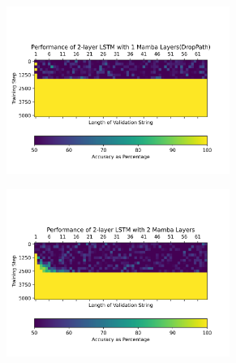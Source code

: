 \begin{figure}
\begin{subfigure}{0.5\textwidth}
\begin{center}
        \end{center}
    \end{subfigure}\begin{subfigure}{0.5\textwidth}
        \begin{center}
        \includegraphics[width=0.8\textwidth]{figures/parity_lstm_True_3_2.png.png}
        \end{center}
    \end{subfigure}
    \begin{subfigure}{0.5\textwidth}
        \begin{center}
        \includegraphics[width=0.8\textwidth]{figures/parity_lstm_False_4_1.png.png}
        \end{center}
    \end{subfigure}\begin{subfigure}{0.5\textwidth}
        \begin{center}

\end{center}
\end{subfigure}
\end{figure}
